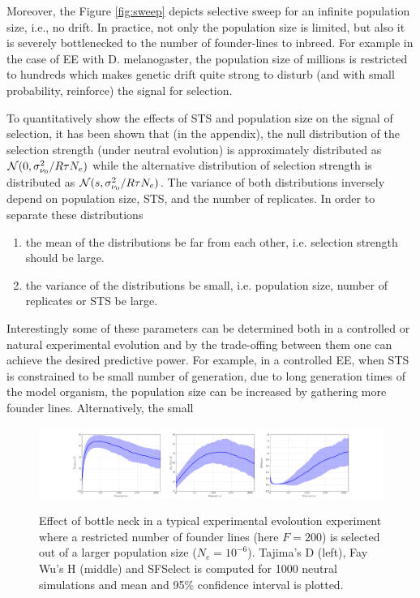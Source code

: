 \documentclass[11pt]{article}
\begin{document}
Moreover, the Figure \ref{fig:sweep} depicts selective sweep for an infinite 
population size, i.e., no drift. In practice, not only the population size is 
limited, but also it is severely bottlenecked to the number of founder-lines to 
inbreed. For example in the case of EE with D. melanogaster, the population 
size of millions is restricted to hundreds which makes genetic drift quite 
strong to disturb (and with small probability, reinforce) the signal for 
selection.



To quantitatively show the effects of STS and population size on the signal of 
selection, it has been shown that (in the appendix), the null distribution of 
the selection strength (under neutral evolution) is approximately distributed 
as ${\cal N}(0,\sigma^2_{\nu_0}/R\tau N_e)$ while the alternative distribution of 
selection strength is distributed as ${\cal N}(s,\sigma^2_{\nu_0}/R\tau N_e)$. The 
variance of both distributions inversely depend on population size, 
STS, and the number of replicates. In order to separate 
these distributions 
\begin{enumerate}
	\item the mean of the distributions be far from each other, i.e. selection 
	strength should be large.
	\item the variance of the distributions be small, i.e. population size, 
	number of replicates or STS be large.
\end{enumerate}
Interestingly some of these parameters can be determined both in a controlled 
or natural experimental evolution and by the trade-offing between them one can 
achieve the desired predictive power.
For example, in a controlled EE, when STS is constrained to be small number of 
generation, due to long generation times of the model organism, the population 
size can be increased by gathering more founder lines. Alternatively, the small 
\begin{figure}
	\centering \label{fig:bottleneck}
	\includegraphics[trim=3.2in 0.1in 3.2in 0.2in , 
	clip,width=\textwidth]{bottleneck}
		\caption{Effect of bottle neck in a typical experimental evoloution 
		experiment where a restricted number of founder lines (here $F=200$) is 
		selected out of a larger population size ($N_e=10^{-6}$). Tajima's D 
		(left), Fay Wu's H (middle) and SFSelect is computed for 1000 neutral 
		simulations and mean and 95\% confidence interval is plotted.} 
		\label{fig:bott}
\end{figure}
\end{document}
